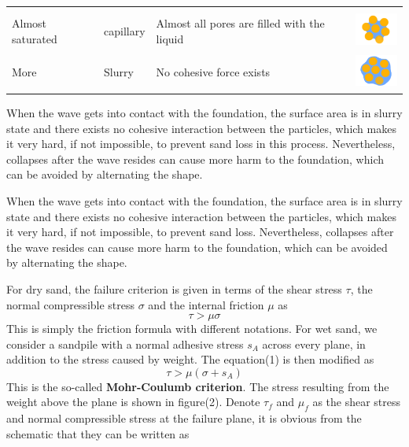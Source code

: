 \documentclass[12pt]{article}
\begin{document}
\begin{table}[H]
\begin{tabular}{p{3.5cm}p{2cm}p{6cm}p{2cm}}
\begin{minipage}{0.1\textwidth}
        \end{minipage} \\
        Almost saturated & capillary & Almost all pores are filled with the liquid    & \begin{minipage}{0.1\textwidth}
            \includegraphics[width=1.5cm, height=1.125cm]{s4.png}
        \end{minipage} \\
        More             & Slurry    & No cohesive force exists                       & \begin{minipage}{0.1\textwidth}
            \includegraphics[width=1.5cm, height=1.125cm]{s5.png}
        \end{minipage} \\
        \hline
    \end{tabular}
    \label{bs2}
\end{table}
\par
When the wave gets into contact with the foundation, the surface area is in slurry state and there exists no cohesive interaction between the particles, which makes it very hard, if not impossible, to prevent sand loss in this process. Nevertheless, collapses after the wave resides can cause more harm to the foundation, which can be avoided by alternating the shape.
\par
When the wave gets into contact with the foundation, the surface area is in slurry state and there exists no cohesive interaction between the particles, which makes it very hard, if not impossible, to prevent sand loss. Nevertheless, collapses after the wave resides can cause more harm to the foundation, which can be avoided by alternating the shape.
\par
For dry sand, the failure criterion is given in terms of the shear stress $\tau$, the normal compressible stress $\sigma$ and the internal friction $\mu$ as
$$\tau > \mu\sigma$$
This is simply the friction formula with different notations. For wet sand, we consider a sandpile with a normal adhesive stress $s_A$ across every plane, in addition to the stress caused by weight. The equation(1) is then modified as
$$\tau > \mu(\sigma + s_A)$$
This is the so-called \textbf{Mohr-Coulumb criterion}. The stress resulting from the weight above the plane is shown in figure(2). Denote $\tau_f$ and $\mu_f$ as the shear stress and normal compressible stress at the failure plane, it is obvious from the schematic that they can be written as
\end{document}
